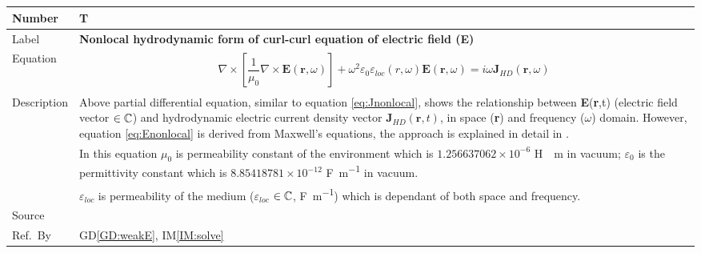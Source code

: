 \documentclass[12pt]{article}
\newcommand{\colBwidth}{0.82\textwidth} \newcommand{\colCwidth}{0.1\textwidth}
\begin{document}
	~\newline
	
	~\newline
	
	\noindent \begin{minipage}{\textwidth} \renewcommand*{\arraystretch}{1.5}
		\begin{tabular}{| p{\colAwidth} | p{\colBwidth}|} \hline \rowcolor[gray]{0.9}
			Number& T{theorynum}\thetheorynum \label{TM:E}\\ \hline
			Label&\bf Nonlocal hydrodynamic form of curl-curl equation of electric field
			(\textbf{E}) \\ \hline Equation& \begin{equation} \label{eq:Enonlocal}
				\begin{gathered} \nabla\times[\dfrac{1}{\mu_{0}}\nabla\times
					\textbf{E}(\textbf{r},\omega)] + \omega^2
					\varepsilon_{0}\varepsilon_{loc}(r,\omega)\textbf{E}(\textbf{r},\omega) = i
					\omega \textbf{J}_{HD}(\textbf{r}, \omega) \end{gathered}  \end{equation} \\
			
			
			\hline Description & Above partial differential equation, similar to equation
			\ref{eq:Jnonlocal}, shows the relationship between \textbf{E}(\textbf{r},t)
			(electric field vector $\in \Bbb C$) and hydrodynamic electric current
			density vector $\textbf{J}_{HD}(\textbf{r},t)$, in space (\textbf{r}) and
			frequency ($\omega$) domain. However, equation \ref{eq:Enonlocal} is derived
			from  Maxwell's equations, the approach is explained in detail in
			\cite{hiremath2012numerical}. \\ & In this equation $\mu_{0}$ is permeability
			constant of the environment which is $1.256637062 \times 10^{-6}$ \si{\henry
				\per \meter} in vacuum; $\varepsilon_{0}$ is the permittivity constant which
			is  $8.85418781 \times 10^{-12}$ \si{\farad \per \meter} in vacuum. \\
			&$\varepsilon_{loc}$ is permeability of the medium ($\varepsilon_{loc}$ $\in
			\Bbb C$, \si{\farad \per \meter}) which is dependant of both space and
			frequency. \\ \hline Source & \cite{hiremath2012numerical} \\ %
			\hline Ref.\ By & GD\ref{GD:weakE}, IM\ref{IM:solve}\\ \hline \end{tabular}
	\end{minipage}\\
	
\end{document}
